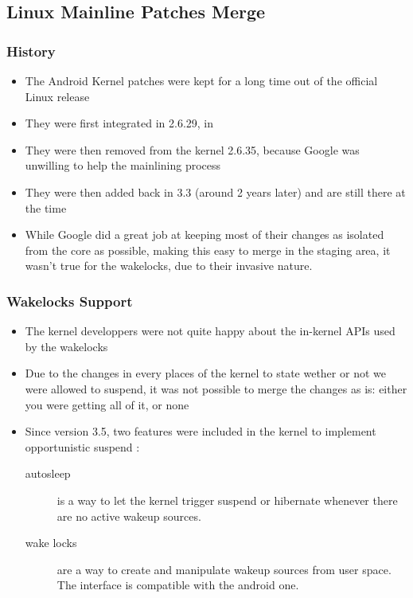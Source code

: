 \subsection{Linux Mainline Patches Merge}
\begin{frame}
  \frametitle{History}
  \begin{itemize}
  \item The Android Kernel patches were kept for a long time out of
    the official Linux release
  \item They were first integrated in 2.6.29, in
  \item They were then removed from the kernel 2.6.35, because Google
    was unwilling to help the mainlining process
  \item They were then added back in 3.3 (around 2 years later) and
    are still there at the time
  \item While Google did a great job at keeping most of their changes
    as isolated from the core as possible, making this easy to merge
    in the staging area, it wasn't true for the wakelocks, due to
    their invasive nature.
  \end{itemize}
\end{frame}

\begin{frame}
  \frametitle{Wakelocks Support}
  \begin{itemize}
  \item The kernel developpers were not quite happy about the
    in-kernel APIs used by the wakelocks
  \item Due to the changes in every places of the kernel to state
    wether or not we were allowed to suspend, it was not possible to
    merge the changes as is: either you were getting all of it, or
    none
  \item Since version 3.5, two features were included in the kernel to
    implement opportunistic suspend :
    \begin{description}
    \item[autosleep] is a way to let the kernel trigger suspend or
      hibernate whenever there are no active wakeup sources.
    \item[wake locks] are a way to create and manipulate wakeup
      sources from user space. The interface is compatible with the
      android one.
    \end{description}
  \end{itemize}
\end{frame}

